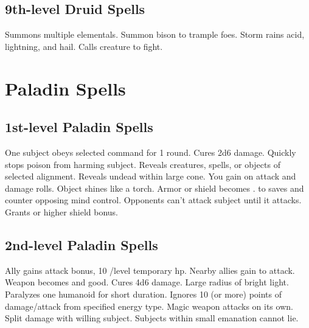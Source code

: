 \subsection{9th-level Druid Spells}
\begin{spelllist}
   Summons multiple elementals.
   Summon bison to trample foes.
   Storm rains acid, lightning, and hail.
   Calls creature to fight.
\end{spelllist}

\section{Paladin Spells}  

\subsection{1st-level Paladin Spells}
\begin{spelllist}
   One subject obeys selected command for 1 round.
   Cures 2d6 damage.
   Quickly stops poison from harming subject.
   Reveals creatures, spells, or objects of selected alignment.
   Reveals undead within large cone.
   You gain  on attack and damage rolls.
   Object shines like a torch.
   Armor or shield becomes .
    to saves and counter opposing mind control.
   Opponents can't attack subject until it attacks.
   Grants  or higher shield bonus.
\end{spelllist}

\subsection{2nd-level Paladin Spells}
\begin{spelllist}
   Ally gains  attack bonus, 10 /level temporary hp.
   Nearby allies gain  to attack.
   Weapon becomes  and good.
   Cures 4d6 damage.
   Large radius of bright light.
   Paralyzes one humanoid for short duration.
   Ignores 10 (or more) points of damage/attack from specified energy type.
   Magic weapon attacks on its own.
   Split damage with willing subject.
   Subjects within small emanation cannot lie.
\end{spelllist}

